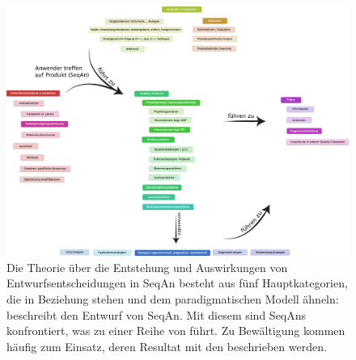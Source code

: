 \thispagestyle{empty}
\begin{landscape}
\begin{figure}
  \centering
    \includegraphics[width=0.8\linewidth]{Figures/research/gt.png}
  \caption[Theorie: Folgen von SeqAn-Entwurfsentscheidungen]{Die Theorie über die Entstehung und Auswirkungen von Entwurfsentscheidungen in SeqAn besteht aus fünf Hauptkategorien, die in Beziehung stehen und dem paradigmatischen Modell ähneln:  beschreibt den Entwurf von SeqAn. Mit diesem sind SeqAns  konfrontiert, was zu einer Reihe von  führt. Zu Bewältigung kommen häufig  zum Einsatz, deren Resultat mit den  beschrieben werden.}
  \label{fig:research-gt}
\end{figure}
\end{landscape}
\restoregeometry



